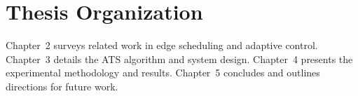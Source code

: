 \section{Thesis Organization}

Chapter~2 surveys related work in edge scheduling and adaptive control.
Chapter~3 details the ATS algorithm and system design. Chapter~4 presents
the experimental methodology and results. Chapter~5 concludes and outlines
directions for future work.
